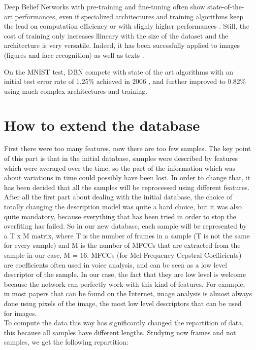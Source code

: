 \documentclass{report}
\begin{document}
	Deep Belief Networks with pre-training and fine-tuning often show 
	state-of-the-art performances, even if specialized architectures and training 
	algorithms keep the lead on computation efficiency or with slighly higher 
	performances \cite{ranzato2008semi}. Still, the cost of training only increases 
	llineary with the size of the dataset and the architecture is very versatile. 
	Indeed, it has been sucessfully applied to images (figures and face 
	recognition) as well as texts \cite{hinton2006reducing}.
	
	On the MNIST test, DBN compete with state of the art algorithms with an initial 
	test error rate of 1.25\% achieved in 2006 
	\cite{hinton2006fast}, and further improved to 0.82\% 
	\cite{lee2009convolutional} using  much complex architectures and training.
	
	\section{How to extend the database}
	
	First there were too many features, now there are too few samples. The key point of this part is that in the initial database, samples were described by features which were averaged over the time, so the part of the information which was about variations in time could possibly have been lost. In order to change that, it has been decided that all the samples will be reprocessed using different features. After all the first part about dealing with the initial database, the choice of totally changing the description model was quite a hard choice, but it was also quite mandatory, because everything that has been tried in order to stop the overfiting has failed. So in our new database, each sample will be represented by a T x M matrix, where T is the number of frames in a sample (T is not the same for every sample) and M is the number of MFCCs that are extracted from the sample in our case, M = 16. MFCCs (for Mel-Frequency Cepstral Coefficients) are coefficients often used in voice analysis, and can be seen as a low level descriptor of the sample. In our case, the fact that they are low level is welcome because the network can perfectly work with this kind of features. For example, in most papers that can be found on the Internet, image analysis is almost always done using pixels of the image, the most low level descriptors that can be used for images.\\
	
	To compute the data this way has significantly changed the repartition of data, this because all samples have different lengths. Studying now frames and not samples, we get the following repartition:
	
\end{document}

